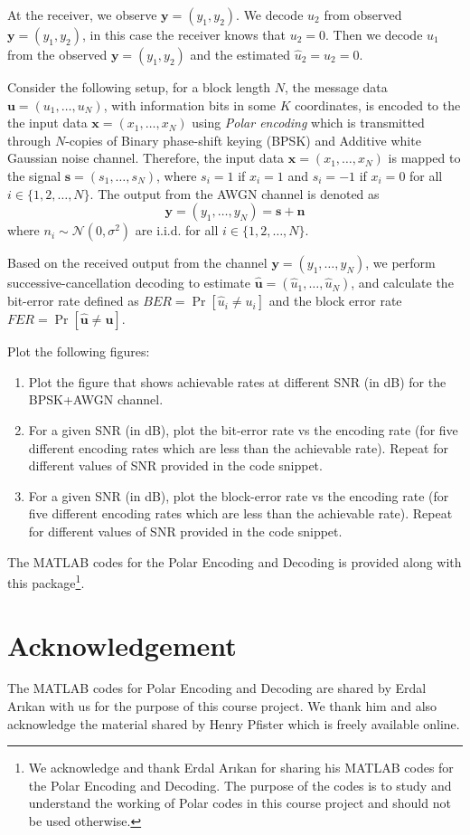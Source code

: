 \documentclass[a4paper,11pt]{article}
\begin{document}
At the receiver, we observe $\mathbf y = (y_1, y_2)$. We decode $u_2$ from observed $\mathbf y = (y_1,y_2)$, in this case the receiver knows that $u_2 = 0$. Then we decode $u_1$ from the observed $\mathbf y = (y_1,y_2)$ and the estimated $\hat u_2 = u_2 = 0$.


{\color{blue}
Consider the following setup, for a block length $N$, the message data $\mathbf u = (u_1,\dots,u_N)$, with information bits in some $K$ coordinates, is encoded to the the input data $\mathbf x = (x_1,\dots,x_N)$ using \textit{Polar encoding} which is transmitted through $N$-copies of Binary phase-shift keying (BPSK) and Additive white Gaussian noise channel. Therefore, the input data $\mathbf x = (x_1,\dots,x_N)$ is mapped to the signal $\mathbf s = (s_1,\dots,s_N)$, where $s_i = 1$ if $x_i = 1$ and $s_i=-1$ if $x_i=0$ for all $i\in\{1,2,\dots,N\}$. The output from the AWGN channel is denoted as
$$\mathbf y = (y_1,\dots,y_N) = \mathbf s + \mathbf n$$
where $n_i \sim \mathcal N(0,\sigma^2)$ are i.i.d. for all $i\in\{1,2,\dots,N\}$.

Based on the received output from the channel $\mathbf y = (y_1,\dots,y_N)$, we perform successive-cancellation decoding to estimate $\hat{\mathbf u} = (\hat u_1,\dots,\hat u_N)$, and calculate the bit-error rate defined as $BER = \Pr[\hat u_i \neq u_i]$
and the block error rate $FER = \Pr[\hat{\mathbf{u}} \neq \mathbf u]$.

Plot the following figures:
\begin{enumerate}
\item Plot the figure that shows achievable rates at different SNR (in dB) for the BPSK+AWGN channel.
\item For a given SNR (in dB), plot the bit-error rate vs the encoding rate (for five different encoding rates which are less than the achievable rate). Repeat for different values of SNR provided in the code snippet.
\item For a given SNR (in dB), plot the block-error rate vs the encoding rate (for five different encoding rates which are less than the achievable rate). Repeat for different values of SNR provided in the code snippet.
\end{enumerate}

The MATLAB codes for the Polar Encoding and Decoding is provided along with this package\footnote{We acknowledge and thank Erdal Arıkan for sharing his MATLAB codes for the Polar Encoding and Decoding. The purpose of the codes is to study and understand the working of Polar codes in this course project and should not be used otherwise.}.
}

\section*{Acknowledgement}
The MATLAB codes for Polar Encoding and Decoding are shared by Erdal Arıkan with us for the purpose of this course project. We thank him and also acknowledge the material shared by Henry Pfister which is freely available online.



\end{document}

